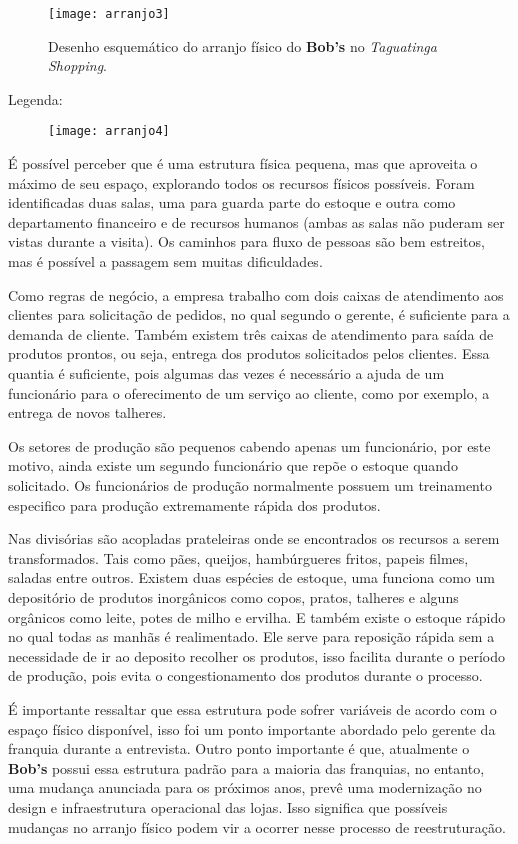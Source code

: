 		\begin{figure}[h]
			\centering
			\texttt{[image: arranjo3]}
			\caption[Desenho esquemático do arranjo físico do Bob's no Taguatinga Shopping]{Desenho esquemático do arranjo físico do \textbf{Bob's} no \emph{Taguatinga Shopping}.}
			\label{fig:arranjo3}
		\end{figure}

		Legenda:
		\begin{figure}[h]
			\centering
			\texttt{[image: arranjo4]}
			\label{fig:arranjo4}
		\end{figure}

		É possível perceber que é uma estrutura física pequena, mas que aproveita o máximo de seu espaço, explorando todos os recursos físicos possíveis. Foram identificadas duas salas, uma para guarda parte do estoque e outra como departamento financeiro e de recursos humanos (ambas as salas não puderam ser vistas durante a visita). Os caminhos para fluxo de pessoas são bem estreitos, mas é possível a passagem sem muitas dificuldades.

		Como regras de negócio, a empresa trabalho com dois caixas de atendimento aos clientes para solicitação de pedidos, no qual segundo o gerente, é suficiente para a demanda de cliente. Também existem três caixas de atendimento para saída de produtos prontos, ou seja, entrega dos produtos solicitados pelos clientes. Essa quantia é suficiente, pois algumas das vezes é necessário a ajuda de um funcionário para o oferecimento de um serviço ao cliente, como por exemplo, a entrega de novos talheres.

		Os setores de produção são pequenos cabendo apenas um funcionário, por este motivo, ainda existe um segundo funcionário que repõe o estoque quando solicitado. Os funcionários de produção normalmente possuem um treinamento especifico para produção extremamente rápida dos produtos. 
	
		Nas divisórias são acopladas prateleiras onde se encontrados os recursos a serem transformados. Tais como pães, queijos, hambúrgueres fritos, papeis filmes, saladas entre outros. Existem duas espécies de estoque, uma funciona como um depositório de produtos inorgânicos como copos, pratos, talheres e alguns orgânicos como leite, potes de milho e ervilha. E também existe o estoque rápido no qual todas as manhãs é realimentado. Ele serve para reposição rápida sem a necessidade de ir ao deposito recolher os produtos, isso facilita durante o período de produção, pois evita o congestionamento dos produtos durante o processo.

		É importante ressaltar que essa estrutura pode sofrer variáveis de acordo com o espaço físico disponível, isso foi um ponto importante abordado pelo gerente da franquia durante a entrevista. Outro ponto importante é que, atualmente o \textbf{Bob’s} possui essa estrutura padrão para a maioria das franquias, no entanto, uma mudança anunciada para os próximos anos, prevê uma modernização no design e infraestrutura operacional das lojas. Isso significa que possíveis mudanças no arranjo físico podem vir a ocorrer nesse processo de reestruturação.